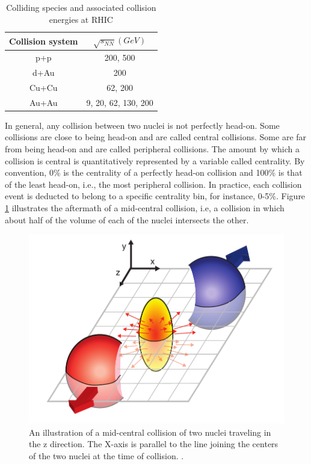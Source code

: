 \begin{table}[h!]
\centering
\begin{tabular}{||c c||}
\hline
Collision system & $\sqrt{s_{NN}}(GeV)$ \\ [0.5ex]
\hline
\hline
p+p & 200, 500 \\
d+Au & 200 \\
Cu+Cu & 62, 200 \\
Au+Au & 9, 20, 62, 130, 200 \\ [1ex]
\hline
\end{tabular}
\caption{Colliding species and associated collision energies at RHIC \cite{phdthesisnattrass}}
\label{table:RHIC_specs}
\end{table}


In general, any collision between two nuclei is not perfectly head-on. Some collisions are close to being head-on and are called central collisions. Some are far from being head-on and are called peripheral collisions. The amount by which a collision is central is quantitatively represented by a variable called centrality. By convention, 0\% is the centrality of a perfectly head-on collision and 100\% is that of the least head-on, i.e., the most peripheral collision. In practice, each collision event is deducted to belong to a specific centrality bin, for instance, 0-5\%. Figure \ref{fig:mid-central_collision} illustrates the aftermath of a mid-central collision, i.e, a collision in which about half of the volume of each of the nuclei intersects the other.
	\begin{figure}[h]
	  \centering
	  \includegraphics[width=4.5in]{figures/flow_elliptic_init_v4.pdf}
	  \caption{An illustration of a mid-central collision of two nuclei traveling in the z direction. The X-axis is parallel to the line joining the centers of the two nuclei at the time of collision. \cite{Connors:2017ptx}.}\label{fig:mid-central_collision}
	\end{figure}

